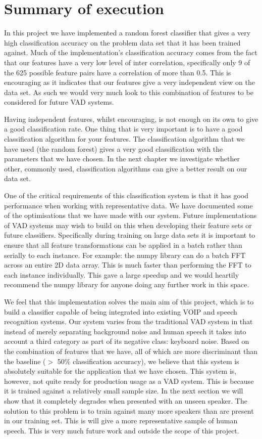 \documentclass[ %
                    author={Sam Phippen},
                supervisor={Dr. Rafal Bogacz},
                     title={Real time voice activity detectors in noisy personal computing environments},
                  subtitle={},
                    degree={MEng},
                      year={2012} ]{thesis}
\begin{document}
\section{Summary of execution}

In this project we have implemented a random forest classifier that gives a
very high classification accuracy on the problem data set that it has been
trained against. Much of the implementation's classification accuracy comes
from the fact that our features have a very low level of inter correlation,
specifically only 9 of the 625 possible feature pairs have a correlation of
more than 0.5. This is encouraging as it indicates that our features give a
very independent view on the data set. As such we would very much look to
this combination of features to be considered for future VAD systems.

Having independent features, whilst encouraging, is not enough on its own to
give a good classification rate. One thing that is very important is to have a
good classification algorithm for your features. The classification algorithm
that we have used (the random forest) gives a very good classification with the
parameters that we have chosen. In the next chapter we investigate whether
other, commonly used, classification algorithms can give a better result on our
data set.

One of the critical requirements of this classification system is that it has
good performance when working with representative data. We have documented some
of the optimisations that we have made with our system. Future implementations
of VAD systems may wish to build on this when developing their feature sets or
future classifiers. Specifically during training on large data sets it is
important to ensure that all feature transformations can be applied in a batch
rather than serially to each instance. For example: the numpy library can do a
batch FFT across an entire 2D data array. This is much faster than performing
the FFT to each instance individually. This gave a large speedup and we would
heartily recommend the numpy library for anyone doing any further work in this
space.

We feel that this implementation solves the main aim of this project, which is
to build a classifier capable of being integrated into existing VOIP and speech
recognition systems. Our system varies from the traditional VAD system in that
instead of merely separating background noise and human speech it takes into
account a third category as part of its negative class: keyboard noise.  Based
on the combination of features that we have, all of which are more discriminant
than the baseline ($>$ 50\% classification accuracy), we believe that this
system is absolutely suitable for the application that we have chosen.  This
system is, however, not quite ready for production usage as a VAD system. This
is because it is trained against a relatively small sample size. In the next
section we will show that it completely degrades when presented with an unseen
speaker. The solution to this problem is to train against many more speakers
than are present in our training set. This is will give a more representative
sample of human speech. This is very much future work and outside the scope of
this project.
\end{document}
